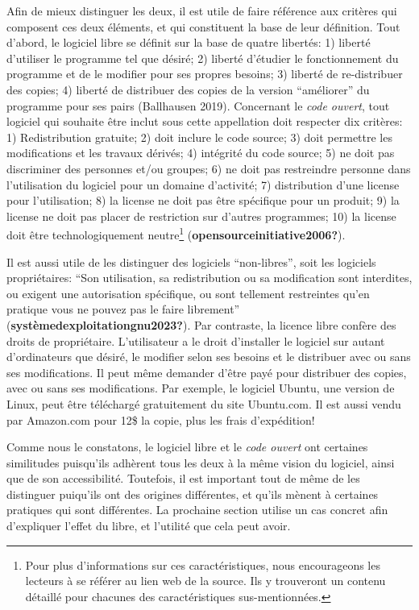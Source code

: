 \documentclass[
  letterpaper,
]{scrbook}
\begin{document}
Afin de mieux distinguer les deux, il est utile de faire référence aux
critères qui composent ces deux éléments, et qui constituent la base de
leur définition. Tout d'abord, le logiciel libre se définit sur la base
de quatre libertés: 1) liberté d'utiliser le programme tel que désiré;
2) liberté d'étudier le fonctionnement du programme et de le modifier
pour ses propres besoins; 3) liberté de re-distribuer des copies; 4)
liberté de distribuer des copies de la version ``améliorer'' du
programme pour ses pairs (Ballhausen 2019). Concernant le \emph{code
ouvert}, tout logiciel qui souhaite être inclut sous cette appellation
doit respecter dix critères: 1) Redistribution gratuite; 2) doit inclure
le code source; 3) doit permettre les modifications et les travaux
dérivés; 4) intégrité du code source; 5) ne doit pas discriminer des
personnes et/ou groupes; 6) ne doit pas restreindre personne dans
l'utilisation du logiciel pour un domaine d'activité; 7) distribution
d'une license pour l'utilisation; 8) la license ne doit pas être
spécifique pour un produit; 9) la license ne doit pas placer de
restriction sur d'autres programmes; 10) la license doit être
technologiquement neutre\footnote{Pour plus d'informations sur ces
  caractéristiques, nous encourageons les lecteurs à se référer au lien
  web de la source. Ils y trouveront un contenu détaillé pour chacunes
  des caractéristiques sus-mentionnées.}
(\textbf{opensourceinitiative2006?}).

Il est aussi utile de les distinguer des logiciels ``non-libres'', soit
les logiciels propriétaires: ``Son utilisation, sa redistribution ou sa
modification sont interdites, ou exigent une autorisation spécifique, ou
sont tellement restreintes qu'en pratique vous ne pouvez pas le faire
librement'' (\textbf{systèmedexploitationgnu2023?}). Par contraste, la
licence libre confère des droits de propriétaire. L'utilisateur a le
droit d'installer le logiciel sur autant d'ordinateurs que désiré, le
modifier selon ses besoins et le distribuer avec ou sans ses
modifications. Il peut même demander d'être payé pour distribuer des
copies, avec ou sans ses modifications. Par exemple, le logiciel Ubuntu,
une version de Linux, peut être téléchargé gratuitement du site
Ubuntu.com. Il est aussi vendu par Amazon.com pour 12\$ la copie, plus
les frais d'expédition!

Comme nous le constatons, le logiciel libre et le \emph{code ouvert} ont
certaines similitudes puisqu'ils adhèrent tous les deux à la même vision
du logiciel, ainsi que de son accessibilité. Toutefois, il est important
tout de même de les distinguer puiqu'ils ont des origines différentes,
et qu'ils mènent à certaines pratiques qui sont différentes. La
prochaine section utilise un cas concret afin d'expliquer l'effet du
libre, et l'utilité que cela peut avoir.
\end{document}
